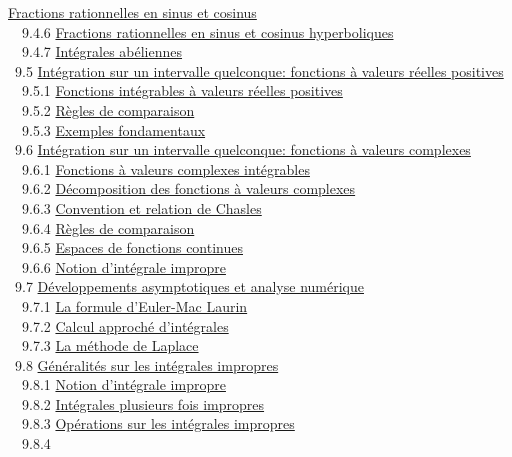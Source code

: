 \documentclass[]{article}
\begin{document}
\href{coursse53.html\#x65-2840009.4.5}{Fractions rationnelles en sinus
et cosinus} \\ ~~9.4.6 \href{coursse53.html\#x65-2850009.4.6}{Fractions
rationnelles en sinus et cosinus hyperboliques} \\ ~~9.4.7
\href{coursse53.html\#x65-2860009.4.7}{Intégrales abéliennes} \\ ~9.5
\href{coursse54.html\#x66-2870009.5}{Intégration sur un intervalle
quelconque: fonctions à valeurs réelles positives} \\ ~~9.5.1
\href{coursse54.html\#x66-2880009.5.1}{Fonctions intégrables à valeurs
réelles positives} \\ ~~9.5.2
\href{coursse54.html\#x66-2890009.5.2}{Règles de comparaison} \\ ~~9.5.3
\href{coursse54.html\#x66-2900009.5.3}{Exemples fondamentaux} \\ ~9.6
\href{coursse55.html\#x67-2910009.6}{Intégration sur un intervalle
quelconque: fonctions à valeurs complexes} \\ ~~9.6.1
\href{coursse55.html\#x67-2920009.6.1}{Fonctions à valeurs complexes
intégrables} \\ ~~9.6.2
\href{coursse55.html\#x67-2930009.6.2}{Décomposition des fonctions à
valeurs complexes} \\ ~~9.6.3
\href{coursse55.html\#x67-2940009.6.3}{Convention et relation de
Chasles} \\ ~~9.6.4 \href{coursse55.html\#x67-2950009.6.4}{Règles de
comparaison} \\ ~~9.6.5 \href{coursse55.html\#x67-2960009.6.5}{Espaces
de fonctions continues} \\ ~~9.6.6
\href{coursse55.html\#x67-2970009.6.6}{Notion d'intégrale impropre} \\
~9.7 \href{coursse56.html\#x68-2980009.7}{Développements asymptotiques
et analyse numérique} \\ ~~9.7.1
\href{coursse56.html\#x68-2990009.7.1}{La formule d'Euler-Mac Laurin} \\
~~9.7.2 \href{coursse56.html\#x68-3000009.7.2}{Calcul approché
d'intégrales} \\ ~~9.7.3 \href{coursse56.html\#x68-3010009.7.3}{La
méthode de Laplace} \\ ~9.8
\href{coursse57.html\#x69-3020009.8}{Généralités sur les intégrales
impropres} \\ ~~9.8.1 \href{coursse57.html\#x69-3030009.8.1}{Notion
d'intégrale impropre} \\ ~~9.8.2
\href{coursse57.html\#x69-3040009.8.2}{Intégrales plusieurs fois
impropres} \\ ~~9.8.3 \href{coursse57.html\#x69-3050009.8.3}{Opérations
sur les intégrales impropres} \\ ~~9.8.4
\end{document}
